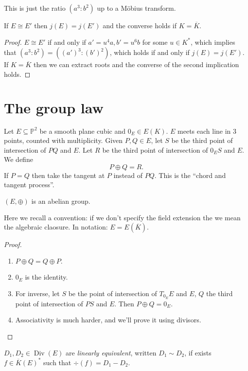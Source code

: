 \documentclass[a4paper]{article}
\theoremstyle{definition}
\theoremstyle{theorem}
\renewcommand*{\P}{\mathbb{P}}
\DeclareMathOperator{\Div}{Div} %
\begin{document}
This is just the ratio \((a^3 : b^2)\) up to a Möbius transform.

\begin{corollary}
  If \(E \cong E'\) then \(j(E) = j(E')\) and the converse holds if \(K = \overline K\).
\end{corollary}

\begin{proof}
  \(E \cong E'\) if and only if \(a' = u^4 a, b' = u^6 b\) for some \(u \in K^*\), which implies that \((a^3: b^2) = ((a')^3 : (b')^2)\), which holds if and only if \(j(E) = j(E')\). If \(K = \overline K\) then we can extract roots and the converse of the second implication holds.
\end{proof}

\section{The group law}

Let \(E \subseteq \P^2\) be a smooth plane cubic and \(0_E \in E(K)\). \(E\) meets each line in 3 points, counted with multiplicity. Given \(P, Q \in E\), let \(S\) be the third point of intersection of \(PQ\) and \(E\). Let \(R\) be the third point of intersection of \(0_ES\) and \(E\). We define
\[
  P \oplus Q = R.
\]
If \(P = Q\) then take the tangent at \(P\) instead of \(PQ\). This is the ``chord and tangent process''.

\begin{theorem}
  \((E, \oplus)\) is an abelian group.
\end{theorem}

Here we recall a convention: if we don't specify the field extension the we mean the algebraic claosure. In notation: \(E = E(\overline K)\).

\begin{proof}\leavevmode
  \begin{enumerate}
  \item \(P \oplus Q = Q \oplus P\).
  \item \(0_E\) is the identity.
  \item For inverse, let \(S\) be the point of intersection of \(T_{0_E}E\) and \(E\), \(Q\) the third point of intersection of \(PS\) and \(E\). Then \(P \oplus Q = 0_E\).
  \item Associativity is much harder, and we'll prove it using divisors.
  \end{enumerate}
\end{proof}

\begin{definition}
  \(D_1, D_2 \in \Div(E)\) are \emph{linearly equivalent}, written \(D_1 \sim D_2\), if exists \(f \in \overline K(E)^*\) such that \(\div (f) = D_1 - D_2\).
\end{definition}
\end{document}
